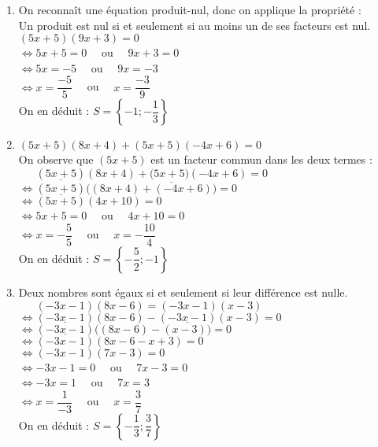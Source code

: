 \documentclass[a4paper,11pt,exos]{nsi} %
\begin{document}
\begin{enumerate}
    \item On reconnaît une équation produit-nul, donc on applique la propriété :\\
    {\color[HTML]{f15929}Un produit est nul si et seulement si au moins un de ses facteurs est nul.}\\$(5x+5)(9x+3)=0$\\$\iff 5x+5=0\quad$ ou $\quad 9x+3=0$\\$\iff 5x=-5\quad$ ou $\quad 9x=-3$\\$\iff x=\dfrac{-5}{5}\quad$ ou $\quad x=\dfrac{-3}{9}$\\On en déduit :  $S=\left\{-1;-\dfrac{1}{3}\right\}$
    
    \item $(5x+5)( 8x+4)+(5x+5)(-4x+6)=0$\\ On observe que $(5x+5)$ est un facteur commun dans les deux termes :\\ $\phantom{\iff} (\underline{5x+5})( 8x+4)+(\underline{5x+5)}( -4x+6)=0$\\ $\iff (\underline{5x+5})\Big(( 8x+4)+(-4x+6)\Big)=0$\\ $\iff (5x+5)( 4x+10)=0$\\$\iff 5x+5=0\quad$ ou $\quad 4x+10=0$\\$\iff x=-\dfrac{5}{5}\quad$ ou $\quad x=-\dfrac{10}{4}$\\
    On en déduit :  $S=\left\{-\dfrac{5}{2};-1\right\}$
    
    \item Deux nombres sont égaux si et seulement si leur différence est nulle.\\$\phantom{\iff}(-3x-1)(8x-6)=(-3x-1)(x-3)$\\$\iff (\underline{-3x-1})(8x-6)-(\underline{-3x-1})(x-3)=0$\\$\iff (\underline{-3x-1})\Big((8x-6)-(x-3)\Big)=0$\\$\iff (-3x-1)(8x-6-x+3)=0$\\$\iff (-3x-1)(7x-3)=0$\\$\iff -3x-1=0\quad$ ou $\quad 7x-3=0$\\$\iff -3x=1 \quad$ ou $\quad 7x=3$\\$\iff x=\dfrac{1}{-3}\quad$ ou $\quad x=\dfrac{3}{7}$\\On en déduit :  $S=\left\{-\dfrac{1}{3};\dfrac{3}{7}\right\}$
\end{enumerate}
\end{document}
